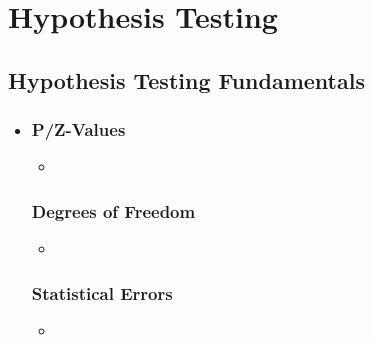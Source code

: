 \chapter{Hypothesis Testing}

\section{Hypothesis Testing Fundamentals}
\begin{itemize}
  \item []

  \subsection{P/Z-Values}
  \begin{itemize}
    \item 
  \end{itemize}
  
  \subsection{Degrees of Freedom}
  \begin{itemize}
    \item 
  \end{itemize}

  \subsection{Statistical Errors}
  \begin{itemize}
    \item 
  \end{itemize}

\end{itemize}

